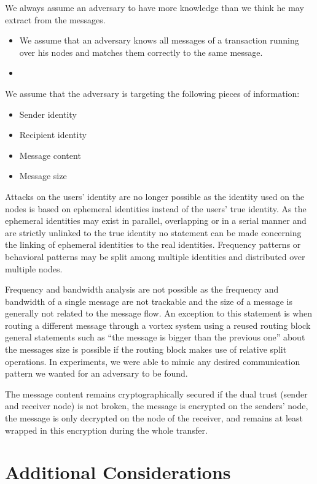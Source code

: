 We always assume an adversary to have more knowledge than we think he may extract from the messages.
\begin{itemize}
	\item We assume that an adversary knows all messages of a transaction running over his nodes and matches them correctly to the same message.
	\item 
\end{itemize}

We assume that the adversary is targeting the following pieces of information:
\begin{itemize}
	\item Sender identity
	\item Recipient identity
	\item Message content
	\item Message size
\end{itemize}

Attacks on the users' identity are no longer possible as the identity used on the nodes is based on ephemeral identities instead of the users' true identity. As the ephemeral identities may exist in parallel, overlapping or in a serial manner and are strictly unlinked to the true identity no statement can be made concerning the linking of ephemeral identities to the real identities. Frequency patterns or behavioral patterns may be split among multiple identities and distributed over multiple nodes. 

Frequency and bandwidth analysis are not possible as the frequency and bandwidth of a single message are not trackable and the size of a message is generally not related to the message flow. An exception to this statement is when routing a different message through a vortex system using a reused routing block general statements such as ``the message is bigger than the previous one'' about the messages size is possible if the routing block makes use of relative split operations. In experiments, we were able to mimic any desired communication pattern we wanted for an adversary to be found.

The message content remains cryptographically secured if the dual trust (sender and receiver node) is not broken, the message is encrypted on the senders' node, the message is only decrypted on the node of the receiver, and remains at least wrapped in this encryption during the whole transfer. 

\section{Additional Considerations}

